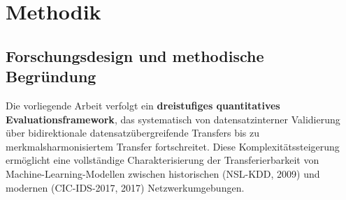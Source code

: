 \documentclass[11pt,a4paper]{article}
\begin{document}
    \section{Methodik}

    \subsection{Forschungsdesign und methodische Begründung}

    Die vorliegende Arbeit verfolgt ein \textbf{dreistufiges quantitatives Evaluationsframework}, das systematisch von datensatzinterner Validierung über bidirektionale datensatzübergreifende Transfers bis zu merkmalsharmonisiertem Transfer fortschreitet. Diese Komplexitätssteigerung ermöglicht eine vollständige Charakterisierung der Transferierbarkeit von Machine-Learning-Modellen zwischen historischen (NSL-KDD, 2009) und modernen (CIC-IDS-2017, 2017) Netzwerkumgebungen.
\end{document}
